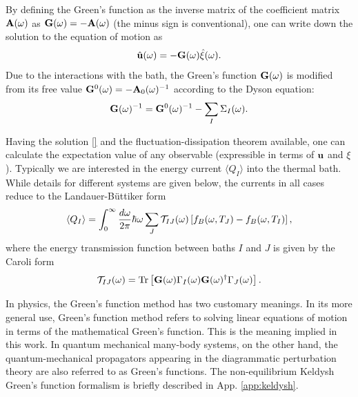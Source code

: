By defining the Green's function as the inverse matrix of the coefficient matrix $\mathbf{A}(\omega)$ as $\mathbf{G}(\omega)= -\mathbf{A}(\omega)$ (the minus sign is conventional), one can write down the solution to the equation of motion as
\begin{equation}
 \hat{\mathbf{u}}(\omega) = - \mathbf{G}(\omega)\hat \xi(\omega).
\end{equation}
Due to the interactions with the bath, the Green's function $\mathbf{G}(\omega)$ is modified from its free value $\mathbf{G}^0(\omega)=-\mathbf{A}_0(\omega) ^{-1}$ according to the Dyson equation:
\begin{equation}
 \mathbf{G}(\omega) ^{-1} = \mathbf{G}^0(\omega)^{-1}-\sum_I \Sigma_I(\omega).
\end{equation}

Having the solution \eqref{} and the fluctuation-dissipation theorem available, one can calculate the expectation value of any observable (expressible in terms of $\mathbf{u}$ and $\xi$). Typically we are interested in the energy current $\langle Q_I \rangle$ into the thermal bath. While details for different systems are given below, the currents in all cases reduce to the Landauer-B\"uttiker form
\begin{equation}
 \langle Q_I \rangle = \int_0^{\infty} \frac{d\omega}{2\pi} \hbar \omega \sum_J \mathcal{T}_{IJ}(\omega) \left[ f_B(\omega,T_J)-f_B(\omega,T_I)\right],
\end{equation}
where the energy transmission function between baths $I$ and $J$ is given by the Caroli form
\begin{equation}
 \mathcal{T}_{IJ}(\omega) = \textrm{Tr} \left[ \mathbf{G}(\omega) \Gamma_I(\omega) \mathbf{G}(\omega)^{\dagger} \Gamma_J(\omega) \right].
\end{equation}





\iffalse
In physics, the Green's function method has two customary meanings. In its more general use, Green's function method refers to solving linear equations of motion in terms of the mathematical Green's function. This is the meaning implied in this work. In quantum mechanical many-body systems, on the other hand, the quantum-mechanical propagators appearing in the diagrammatic perturbation theory are also referred to as Green's functions. The non-equilibrium Keldysh Green's function formalism is briefly described in App. \ref{app:keldysh}. 

